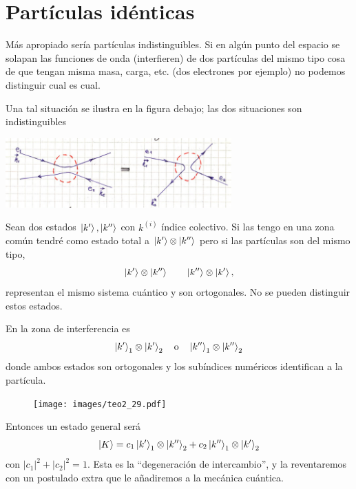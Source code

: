 \documentclass[10pt,oneside]{CBFT_book}
\begin{document}
\chapter{Partículas idénticas}

Más apropiado sería partículas indistinguibles. Si en algún punto del espacio se solapan las funciones de 
onda (interfieren) de dos partículas del mismo tipo cosa de que tengan misma masa, carga, etc. (dos 
electrones por ejemplo) no podemos distinguir cual es cual. 

Una tal situación se ilustra en la figura debajo; las dos situaciones son indistinguibles

\includegraphics[width=0.65\textwidth]{images/fig_ft2_identical_particles.jpg}

Sean dos estados $\Ket{k'},\Ket{k''}$ con $k^{(i)}$ índice colectivo. 
Si las tengo en una zona común tendré como estado total a $\Ket{k'} \otimes \Ket{k''} $
pero si las partículas son del mismo tipo, 
\[
	\Ket{k'} \otimes \Ket{k''} \qquad \Ket{k''} \otimes \Ket{k'},
\]
representan el mismo sistema cuántico y son ortogonales. No se pueden distinguir estos estados.

En la zona de interferencia es 
\[
	\Ket{k'}_1 \otimes \Ket{k'}_2 \quad \text{o} \quad \Ket{k''}_1 \otimes \Ket{k''}_2
\]
donde ambos estados son ortogonales y los subíndices numéricos identifican a la partícula. 

\begin{figure}[htb]
	\begin{center}
	\texttt{[image: images/teo2\_29.pdf]}
	\end{center}
	\caption{}
\end{figure} 

	

Entonces un estado general será
\[
	\Ket{K} = c_1 \Ket{k'}_1 \otimes \Ket{k''}_2 + c_2 \Ket{k''}_1 \otimes \Ket{k'}_2
\]
con $|c_1|^2 +|c_2|^2= 1$. 
Esta es la ``degeneración de intercambio'', y la reventaremos con un postulado extra que le
añadiremos a la mecánica cuántica.
\end{document}
